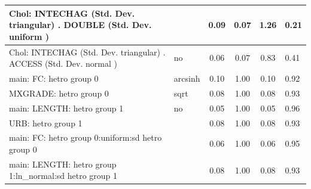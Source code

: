 \begin{table}
\begin{center}
\begin{tabular}{|l|l|c|c|c|l|}
			\hline
			 Chol: INTECHAG (Std. Dev. triangular) . DOUBLE (Std. Dev.   uniform ) &  & 0.09 & 0.07 & 1.26 & 0.21 \\
			\hline
			 Chol: INTECHAG (Std. Dev. triangular) . ACCESS (Std. Dev.   normal ) & no & 0.06 & 0.07 & 0.83 & 0.41 \\
			\hline
			main: FC: hetro group 0 & arcsinh & 0.10 & 1.00 & 0.10 & 0.92 \\
			\hline
			MXGRADE: hetro group 0 & sqrt & 0.08 & 1.00 & 0.08 & 0.93 \\
			\hline
			main: LENGTH: hetro group 1 & no & 0.05 & 1.00 & 0.05 & 0.96 \\
			\hline
			URB: hetro group 1 &  & 0.08 & 1.00 & 0.08 & 0.93 \\
			\hline
			main: FC: hetro group 0:uniform:sd  hetro group 0 &  & 0.06 & 1.00 & 0.06 & 0.95 \\
			\hline
			main: LENGTH: hetro group 1:ln_normal:sd  hetro group 1 &  & 0.08 & 1.00 & 0.08 & 0.93 \\
			\hline
		\end{tabular}
	\end{center}
\end{table}